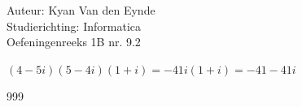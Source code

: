\documentclass[a4paper]{article}
\begin{document}
  
\noindent \large Auteur: Kyan Van den Eynde \\
\noindent \large Studierichting: Informatica\\
\noindent \large Oefeningenreeks 1B nr. 9.2\\

\medskip

\normalsize

$(4-5i)(5-4i)(1+i) = -41i(1+i) = -41-41i$\\

\begin{thebibliography}{999}
\end{thebibliography}
\end{document}
